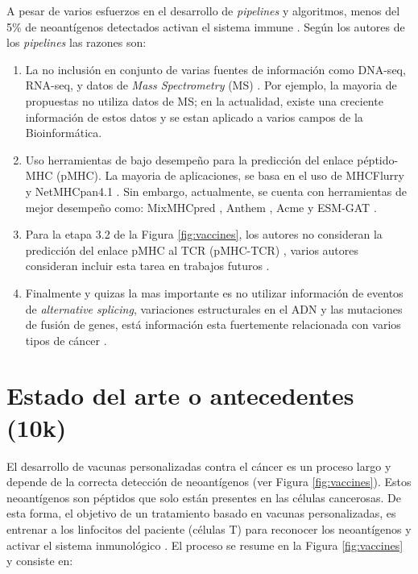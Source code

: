 \documentclass[a4paper,11pt]{article}
\begin{document}
A pesar de varios esfuerzos en el desarrollo de \textit{pipelines} y algoritmos, menos del 5\% de neoantígenos detectados activan el sistema immune \cite{de2020neoantigen, mill2022neoms, bulik2019deep, bassani2015mass, yadav2014predicting}. Según los autores de los \textit{pipelines} las razones son: 

\begin{enumerate}
	\item La no inclusión en conjunto de varias fuentes de información como DNA-seq, RNA-seq, y datos de \textit{Mass Spectrometry} (MS) \cite{kim2018neopepsee}. Por ejemplo, la mayoria de  propuestas no utiliza datos de MS; en la actualidad, existe una creciente información de estos datos y se estan aplicado a varios campos de la Bioinformática.
	
	\item  Uso herramientas de bajo desempeño para la predicción del enlace péptido-MHC (pMHC). La mayoria de aplicaciones, se basa en el uso de MHCFlurry \cite{o2020mhcflurry} y NetMHCpan4.1 \cite{reynisson2020netmhcpan}. Sin embargo, actualmente, se cuenta con herramientas de mejor desempeño como: MixMHCpred \cite{gfeller2023improved},  Anthem \cite{mei2021anthem}, Acme \cite{hu2019acme} y ESM-GAT \cite{hashemi2023improved}.
	
	\item Para la etapa 3.2 de la Figura \ref{fig:vaccines}, los autores no consideran  la predicción del enlace pMHC al TCR (pMHC-TCR) , varios autores consideran incluir esta tarea en trabajos futuros  \cite{rubinsteyn2018computational}.
	
	\item Finalmente y quizas la mas importante es no utilizar información de eventos de \textit{alternative splicing}, variaciones estructurales en el ADN y las mutaciones de fusión de genes, está información esta fuertemente relacionada con varios tipos de cáncer \cite{wood2020neoepiscope}.
\end{enumerate}

\section{Estado del arte o antecedentes (10k)}
	

	
El desarrollo de vacunas personalizadas contra el cáncer es un proceso largo y depende de la correcta detección de neoantígenos (ver Figura \ref{fig:vaccines}). Estos neoantígenos son péptidos que solo están presentes en las células cancerosas. De esta forma, el objetivo de un tratamiento basado en vacunas personalizadas, es entrenar a los linfocitos del paciente (células T) para reconocer los neoantígenos y activar el sistema inmunológico \cite{de2020neoantigen, peng2019neoantigen}. El proceso se resume en la Figura \ref{fig:vaccines} y consiste en: 
	
\end{document}
